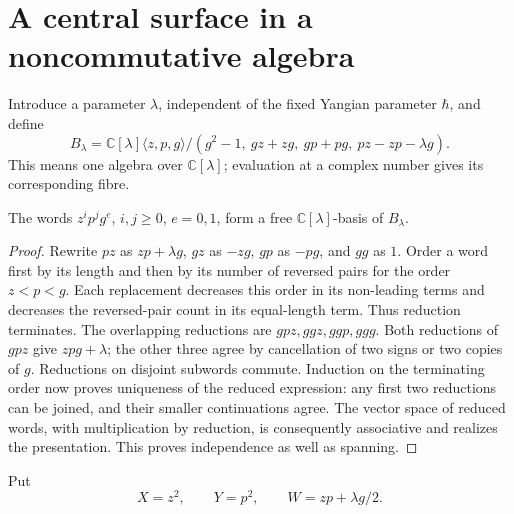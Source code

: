 \section{A central surface in a noncommutative algebra}

Introduce a parameter \(\lambda\), independent of the fixed Yangian
parameter \(\hbar\), and define
\begin{equation}\label{eq:cs-deformation}
 B_\lambda=
 \mathbb C[\lambda]\langle z,p,g\rangle/
 (g^2-1,\ gz+zg,\ gp+pg,\ pz-zp-\lambda g).
\end{equation}
This means one algebra over \(\mathbb C[\lambda]\); evaluation at a
complex number gives its corresponding fibre.

\begin{lemma}\label{lem:cs-pbw}
The words \(z^ip^jg^e\), \(i,j\geq0\), \(e=0,1\), form a free
\(\mathbb C[\lambda]\)-basis of \(B_\lambda\).
\end{lemma}
\begin{proof}
Rewrite \(pz\) as \(zp+\lambda g\), \(gz\) as \(-zg\),
\(gp\) as \(-pg\), and \(gg\) as \(1\).
Order a word first by its length and then by its number of reversed
pairs for the order \(z<p<g\). Each replacement decreases this order
in its non-leading terms and decreases the reversed-pair count in
its equal-length term. Thus reduction terminates.
The overlapping reductions are \(gpz,ggz,ggp,ggg\).
Both reductions of \(gpz\) give \(zpg+\lambda\); the other three
agree by cancellation of two signs or two copies of \(g\).
Reductions on disjoint subwords commute. Induction on the terminating
order now proves uniqueness of the reduced expression: any first
two reductions can be joined, and their smaller continuations agree.
The vector space of reduced words, with multiplication by reduction,
is consequently associative and realizes the presentation. This
proves independence as well as spanning.
\end{proof}

Put
\begin{equation}\label{eq:cs-central-coordinates}
 X=z^2,\qquad Y=p^2,\qquad W=zp+\lambda g/2.
\end{equation}

